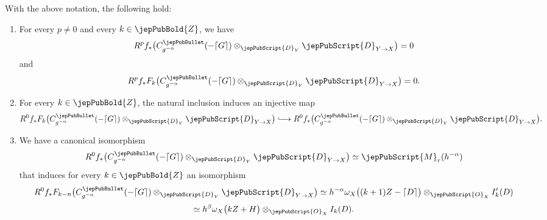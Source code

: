 \begin{theorem}\label{formula_log_resolution}
With the above notation, the following hold:
\begin{enumerate}
\item[(i)] For every $p\neq 0$ and every $k\in \jepPubBold{Z}$, we have
$$R^pf_*\big(C^{\jepPubBullet}_{g^{-\alpha}}(-\lceil G\rceil)\otimes_{\jepPubScript{D}_Y}\jepPubScript{D}_{Y\to X}\big)=0$$
and  
$$R^pf_*F_k\big(C^{\jepPubBullet}_{g^{-\alpha}}(-\lceil G\rceil)
\otimes_{\jepPubScript{D}_Y}\jepPubScript{D}_{Y\to X}\big)=0.$$
\item[(ii)] For every $k\in\jepPubBold{Z}$, the natural inclusion induces an injective map
$$ R^0f_*F_k\big(C^{\jepPubBullet}_{g^{-\alpha}}(-\lceil G\rceil)\otimes_{\jepPubScript{D}_Y}\jepPubScript{D}_{Y\to X}\big)\lhook\joinrel\longrightarrow R^0f_*\big(C^{\jepPubBullet}_{g^{-\alpha}}(-\lceil G\rceil)\otimes_{\jepPubScript{D}_Y}\jepPubScript{D}_{Y\to X}\big).$$
\item[(iii)] We have a canonical isomorphism
$$R^0f_*\big(C^{\jepPubBullet}_{g^{-\alpha}}(-\lceil G\rceil)\otimes_{\jepPubScript{D}_Y}\jepPubScript{D}_{Y\to X}\big)\simeq \jepPubScript{M}_r(h^{-\alpha})$$ 
that induces for every $k\in\jepPubBold{Z}$ an isomorphism
$$R^0f_*F_{k-n}\big(C^{\jepPubBullet}_{g^{-\alpha}}(-\lceil G\rceil)\otimes_{\jepPubScript{D}_Y}\jepPubScript{D}_{Y\to X}\big)\simeq h^{-\alpha}\omega_X\big((k+1)Z-\lceil D\rceil\big)\otimes_{\jepPubScript{O}_X}I_k^\prime (D)$$
$$\simeq h^{\beta}\omega_X\big(kZ + H \big)\otimes_{\jepPubScript{O}_X}I_k(D).$$
\end{enumerate}
\end{theorem}

